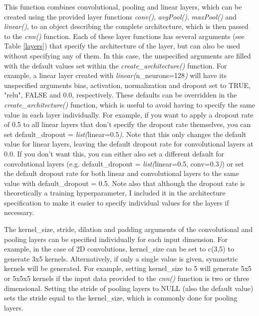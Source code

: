 \documentclass[12pt,twoside]{scrreport}
\newcommand{\fn}[2][]{\textit{#2(}#1\textit{)}}
\begin{document}
This function combines convolutional, pooling and linear layers, which can be created using the provided layer functions \fn{conv}, \fn{avgPool}, \fn{maxPool} and \fn{linear}, to an object describing the complete architecture, which is then passed to the \fn{cnn} function. Each of these layer functions has several arguments (see Table \ref{layers}) that specify the architecture of the layer, but can also be used without specifying any of them. In this case, the unspecified arguments are filled with the default values set within the \fn{create\_architecture} function. For example, a linear layer created with \fn[n\_neurons=128]{linear} will have its unspecified arguments bias, activation, normalization and dropout set to TRUE, "relu", FALSE and 0.0, respectively. These defaults can be overridden in the \fn{create\_architecture} function, which is useful to avoid having to specify the same value in each layer individually. For example, if you want to apply a dropout rate of 0.5 to all linear layers that don't specify the dropout rate themselves, you can set default\_dropout = \fn[linear=0.5]{list}. Note that this only changes the default value for linear layers, leaving the default dropout rate for convolutional layers at 0.0. If you don't want this, you can either also set a different default for convolutional layers (e.g. default\_dropout = \fn[linear=0.5, conv=0.3]{list}) or set the default dropout rate for both linear and convolutional layers to the same value with default\_dropout = 0.5. Note also that although the dropout rate is theoretically a training hyperparameter, I included it in the architecture specification to make it easier to specify individual values for the layers if necessary.

The kernel\_size, stride, dilation and padding arguments of the convolutional and pooling layers can be specified individually for each input dimension. For example, in the case of 2D convolutions, kernel\_size can be set to c(3,5) to generate 3x5 kernels. Alternatively, if only a single value is given, symmetric kernels will be generated. For example, setting kernel\_size to 5 will generate 5x5 or 5x5x5 kernels if the input data provided to the \fn{cnn} function is two or three dimensional. Setting the stride of pooling layers to NULL (also the default value) sets the stride equal to the kernel\_size, which is commonly done for pooling layers.
\end{document}
